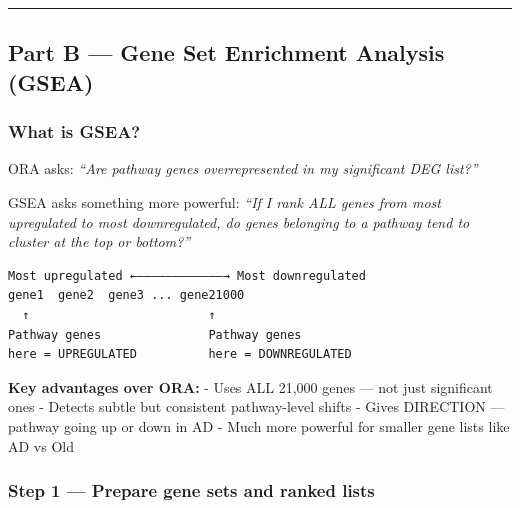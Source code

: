 \documentclass[
]{article}
\begin{document}
\begin{center}\rule{0.5\linewidth}{0.5pt}\end{center}

\subsection{Part B --- Gene Set Enrichment Analysis
(GSEA)}\label{part-b-gene-set-enrichment-analysis-gsea}

\subsubsection{What is GSEA?}\label{what-is-gsea}

ORA asks: \emph{``Are pathway genes overrepresented in my significant
DEG list?''}

GSEA asks something more powerful: \emph{``If I rank ALL genes from most
upregulated to most downregulated, do genes belonging to a pathway tend
to cluster at the top or bottom?''}

\begin{verbatim}
Most upregulated ←————————————→ Most downregulated
gene1  gene2  gene3 ... gene21000
  ↑                         ↑
Pathway genes               Pathway genes
here = UPREGULATED          here = DOWNREGULATED
\end{verbatim}

\textbf{Key advantages over ORA:} - Uses ALL 21,000 genes --- not just
significant ones - Detects subtle but consistent pathway-level shifts -
Gives DIRECTION --- pathway going up or down in AD - Much more powerful
for smaller gene lists like AD vs Old

\subsubsection{Step 1 --- Prepare gene sets and ranked
lists}\label{step-1-prepare-gene-sets-and-ranked-lists}
\end{document}
